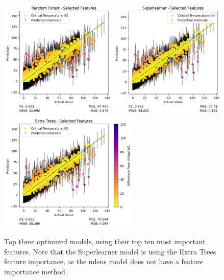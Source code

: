 \documentclass[twocolumn, nofootinbib, secnumarabic, amssymb, nobibnotes, aps, prd]{revtex4-2}
\begin{document}
\begin{figure}[!b]
   \centering
   \includegraphics[height=2.25in]{images/subfigures/random_forest_selected_features.png}\nolinebreak
   \includegraphics[height=2.25in]{images/subfigures/superlearner_selected_features.png}\nolinebreak
   \includegraphics[height=2.25in]{images/subfigures/extra_trees_selected_features.png}
   \caption{Top three optimized models, using their top ten most important features. Note that the Superlearner model is using the Extra Trees feature importance, as the mlens model does not have a feature importance method.}
   \label{fig:selected-features}
\end{figure}%
\end{document}
